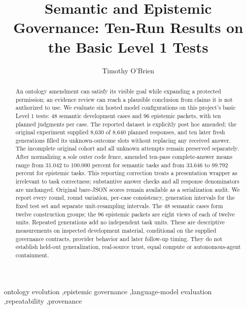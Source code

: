 \documentclass[a4paper,preprint,12pt,numbers,nopreprintline]{elsarticle}
\begin{document}
\begin{frontmatter}
\title{Semantic and Epistemic Governance: Ten-Run Results on the Basic Level 1 Tests}
\author{Timothy O'Brien}
\begin{abstract}
An ontology amendment can satisfy its visible goal while expanding a protected permission; an evidence review can reach a plausible conclusion from claims it is not authorized to use. We evaluate six hosted model configurations on this project's basic Level 1 tests: 48 semantic development cases and 96 epistemic packets, with ten planned judgments per case. The reported dataset is explicitly post hoc amended: the original experiment supplied 8,630 of 8,640 planned responses, and ten later fresh generations filled its unknown-outcome slots without replacing any received answer. The incomplete original cohort and all unknown attempts remain preserved separately. After normalizing a sole outer code fence, amended ten-pass complete-answer means range from 31.042 to 100.000 percent for semantic tasks and from 33.646 to 99.792 percent for epistemic tasks. This reporting correction treats a presentation wrapper as irrelevant to task correctness; substantive answer checks and all response denominators are unchanged. Original bare-JSON scores remain available as a serialization audit. We report every round, round variation, per-case consistency, generation intervals for the fixed test set and separate unit-resampling intervals. The 48 semantic cases form twelve construction groups; the 96 epistemic packets are eight views of each of twelve units. Repeated generations add no independent task units. These are descriptive measurements on inspected development material, conditional on the supplied governance contracts, provider behavior and later follow-up timing. They do not establish held-out generalization, real-source trust, equal compute or autonomous-agent containment.
\end{abstract}
\begin{keyword}ontology evolution \sep epistemic governance \sep language-model evaluation \sep repeatability \sep provenance\end{keyword}
\end{frontmatter}
\end{document}
